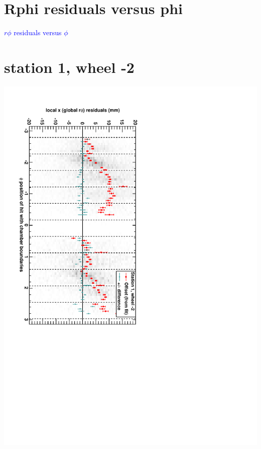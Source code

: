 \documentclass[compress]{beamer}
\begin{document}

\section*{Rphi residuals versus phi}
\begin{frame}
\begin{center}
  \Huge \textcolor{blue}{$r\phi$ residuals versus $\phi$}
\end{center}
\end{frame}

\section*{station 1, wheel -2}
\begin{frame} \vfill \mbox{\hspace{-1 cm}\includegraphics[height=1.2\linewidth, angle=90]{DTrphiVsPhi_st1_whA.pdf}} \end{frame}
\end{document}
